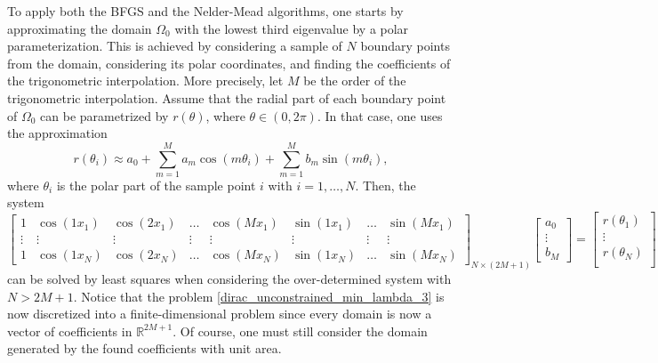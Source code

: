 To apply both the \ac{BFGS} and the Nelder-Mead algorithms, one starts by approximating the domain \(\Omega_0\) with the lowest third eigenvalue by a polar parameterization. This is achieved by considering a sample of \(N\) boundary points from the domain, considering its polar coordinates, and finding the coefficients of the trigonometric interpolation. More precisely, let \(M\) be the order of the trigonometric interpolation. Assume that the radial part of each boundary point of \(\Omega_0\) can be parametrized by \(r(\theta)\), where \(\theta \in (0, 2\pi)\). In that case, one uses the approximation
\[
    r(\theta_i) \approx a_0 + \sum_{m=1}^{M}a_m \cos(m \theta_i) + \sum_{m=1}^{M}b_m \sin(m \theta_i),
\]
where \(\theta_i\) is the polar part of the sample point \(i\) with \(i=1,\dots,N\). Then, the system
\[
    \begin{bmatrix}
        1 & \cos(1 x_1) & \cos(2 x_1) & \dots & \cos(M x_1) & \sin(1 x_1) & \dots & \sin(M x_1)\\
        \vdots & \vdots & \vdots & \vdots & \vdots & \vdots & \vdots & \vdots\\
        1 & \cos(1 x_N) & \cos(2 x_N) & \dots & \cos(M x_N) & \sin(1 x_N) & \dots & \sin(M x_N)
    \end{bmatrix}_{N\times(2M+1)}
    \begin{bmatrix}
        a_0\\
        \vdots\\
        b_M
    \end{bmatrix}
    =
    \begin{bmatrix}
        r(\theta_1)\\
        \vdots\\
        r(\theta_N)\\
    \end{bmatrix}
\]
can be solved by least squares when considering the over-determined system with \(N > 2M+1\). Notice that the problem \eqref{dirac_unconstrained_min_lambda_3} is now discretized into a finite-dimensional problem since every domain is now a vector of coefficients in \(\mathbb{R}^{2M+1}\). Of course, one must still consider the domain generated by the found coefficients with unit area.


